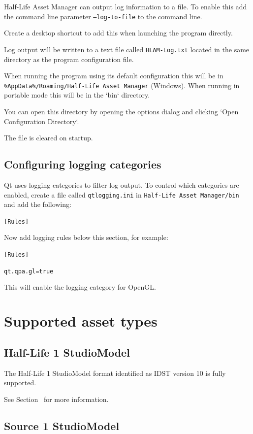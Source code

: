 \documentclass[10pt, a4paper, titlepage, oneside]{article}
\newcommand{\code}[1]{\mbox{\texttt{#1}}}
\begin{document}
Half-Life Asset Manager can output log information to a file. To enable this add the command line parameter \code{--log-to-file} to the command line.

Create a desktop shortcut to add this when launching the program directly.

Log output will be written to a text file called \code{HLAM-Log.txt} located in the same directory as the program configuration file.

When running the program using its default configuration this will be in \code{\%AppData\%/Roaming/Half-Life Asset Manager} (Windows).
When running in portable mode this will be in the `bin` directory.

You can open this directory by opening the options dialog and clicking `Open Configuration Directory`.

The file is cleared on startup.


\subsection{Configuring logging categories}

Qt uses logging categories to filter log output. To control which categories are enabled, create a file called \code{qtlogging.ini} in \code{Half-Life Asset Manager/bin} and add the following:

\code{[Rules]}

Now add logging rules below this section, for example:

\code{[Rules]}

\code{qt.qpa.gl=true}

This will enable the logging category for OpenGL.

\newpage

\section{Supported asset types}
\label{sec:supported_asset_types}

\subsection{Half-Life 1 StudioModel}

The Half-Life 1 StudioModel format identified as IDST version 10 is fully supported.

See Section~ for more information.

\subsection{Source 1 StudioModel}
\end{document}
